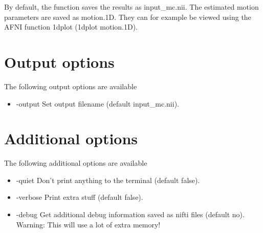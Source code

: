 By default, the function saves the results as input\_mc.nii. The estimated motion parameters are saved as motion.1D. They can for example be viewed using the AFNI function 1dplot (1dplot motion.1D).

\section{Output options}

The following output options are available

\begin{itemize}

\item -output 
\newline \newline Set output filename (default input\_mc.nii). 

\end{itemize}

\section{Additional options}

The following additional options are available

\begin{itemize}

\item -quiet 
\newline \newline Don't print anything to the terminal (default false). 

\item -verbose
\newline \newline Print extra stuff (default false).
 
\item -debug 
\newline \newline Get additional debug information saved as nifti files (default no). Warning: This will use a lot of extra memory! 

\end{itemize}


